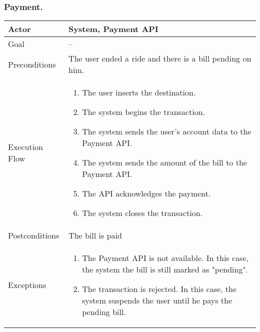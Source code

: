\documentclass{article}
\begin{document}
  \subsubsection{Payment.}
	\begin{tabularx}{\textwidth}{  l  X  }
		\hline
		Actor & System, Payment API\\
		\hline
		Goal & --\\
		\hline
		Preconditions & The user ended a ride and there is a bill pending on him.\\
		\hline
		Execution Flow & \begin{enumerate}
			\item{The user inserts the destination.}
                     \item{The system begins the transaction.}
                     \item{The system sends the user's account data to the Payment API.}
                     \item{The system sends the amount of the bill to the Payment API.}
                     \item{The API acknowledges the payment.}
										 \item{The system closes the transaction.}
										\end{enumerate}\\
		\hline
		Postconditions & The bill is paid\\
		\hline
		Exceptions & \begin{enumerate}
				\item{The Payment API is not available. In this case, the system the bill is still marked as "pending".}
				\item{The transaction is rejected. In this case, the system suspends the user until he pays the pending bill.}
	\end{enumerate}\\
		\hline
	\end{tabularx}
\end{document}
